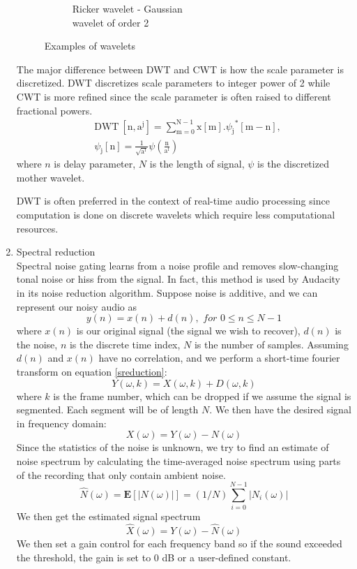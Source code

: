 \begin{enumerate}
\begin{figure}
\begin{subfigure}{.4\textwidth}
          \caption{Ricker wavelet - Gaussian \\wavelet of order 2}
          \label{Ricker}
        \end{subfigure}

        \caption{Examples of wavelets}
        \label{fig:test}
    \end{figure}
    
    The major difference between DWT and CWT is how the scale parameter is discretized. DWT discretizes scale parameters to integer power of 2 while CWT is more refined since 
    the scale parameter is often raised to different fractional powers.
    \begin{align*} &\text{DWT}\ [\mathrm{n},\mathrm{a}^{\mathrm{j}}]=\sum_{\mathrm{m}=0}^{\mathrm{N}-1}\mathrm{x}[\mathrm{m}].{\psi_{\mathrm{j}}}^{*}[\mathrm{m}-\mathrm{n}],\\ &\psi_{\mathrm{j}}[\mathrm{n}]=\frac{1}{\sqrt{\mathrm{a}^{\mathrm{f}}}}\psi\left(\frac{\mathrm{n}}{\mathrm{a}^{\mathrm{f}}}\right) \tag{2} \end{align*}
    where $n$ is delay parameter, $N$ is the length of signal, $\psi$ is the discretized mother wavelet. 

    DWT is often preferred in the context of real-time audio processing since computation is done on discrete wavelets which require less computational resources.
    
    \item Spectral reduction\\
    Spectral noise gating learns from a noise profile and removes slow-changing tonal noise or hiss from the signal. In 
    fact, this method is used by Audacity in its noise reduction algorithm. 
    Suppose noise is additive, and we can represent our noisy audio as
    \[y(n) = x(n) + d(n), \textit{ for } 0 \leq n \leq N-1 \label{sreduction} \]
    where $x(n)$ is our original signal (the signal we wish to recover), $d(n)$ is the noise, $n$ is the discrete time index,
    $N$ is the number of samples. 
    Assuming $d(n)$ and $x(n)$ have no correlation, and we perform a short-time fourier transform on equation \ref{sreduction}:
    \[Y(\omega,k)= X(\omega,k) + D(\omega,k)\]
    where $k$ is the frame number, which can be dropped if we assume the signal is segmented. Each segment will be of
    length $N$. We then have the desired signal in frequency domain:
    \[X(\omega) = Y(\omega) - N(\omega)\]
    Since the statistics of the noise is unknown, we try to find an estimate of noise spectrum by calculating the time-averaged
    noise spectrum using parts of the recording that only contain ambient noise. 
    \[\hat{N}(\omega) = \textbf{E}[|N(\omega)|] = (1/N)\sum_{i=0}^{N-1}|N_i(\omega)|\]
    We then get the estimated signal spectrum
    \[\hat{X}(\omega) = Y(\omega) - \hat{N}(\omega)\]
    We then set a gain control for each frequency band so if the sound exceeded the threshold, the gain is set to 0 dB or a user-defined
    constant.
\end{enumerate}
